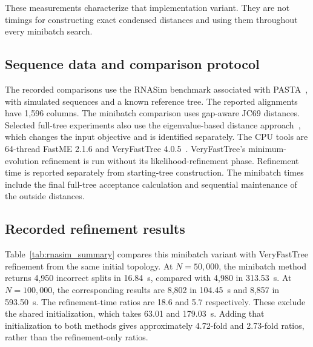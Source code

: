 These measurements characterize that implementation variant.
They are not timings for constructing exact condensed distances and using them throughout every minibatch search.

\subsection{Sequence data and comparison protocol}

The recorded comparisons use the RNASim benchmark associated with PASTA~\cite{mirarab2015pasta}, with simulated sequences and a known reference tree.
The reported alignments have 1,596 columns.
The minibatch comparison uses gap-aware JC69 distances.
Selected full-tree experiments also use the eigenvalue-based distance approach~\cite{penn2025eigen}, which changes the input objective and is identified separately.
The CPU tools are 64-thread FastME 2.1.6 and VeryFastTree 4.0.5~\cite{lefort2015fastme,pineiro2020veryfasttree}.
VeryFastTree's minimum-evolution refinement is run without its likelihood-refinement phase.
Refinement time is reported separately from starting-tree construction.
The minibatch times include the final full-tree acceptance calculation and sequential maintenance of the outside distances.

\subsection{Recorded refinement results}

Table~\ref{tab:rnasim_summary} compares this minibatch variant with VeryFastTree refinement from the same initial topology.
At $N=50{,}000$, the minibatch method returns 4,950 incorrect splits in 16.84~s, compared with 4,980 in 313.53~s.
At $N=100{,}000$, the corresponding results are 8,802 in 104.45~s and 8,857 in 593.50~s.
The refinement-time ratios are 18.6 and 5.7 respectively.
These exclude the shared initialization, which takes 63.01 and 179.03~s.
Adding that initialization to both methods gives approximately 4.72-fold and 2.73-fold ratios, rather than the refinement-only ratios.

